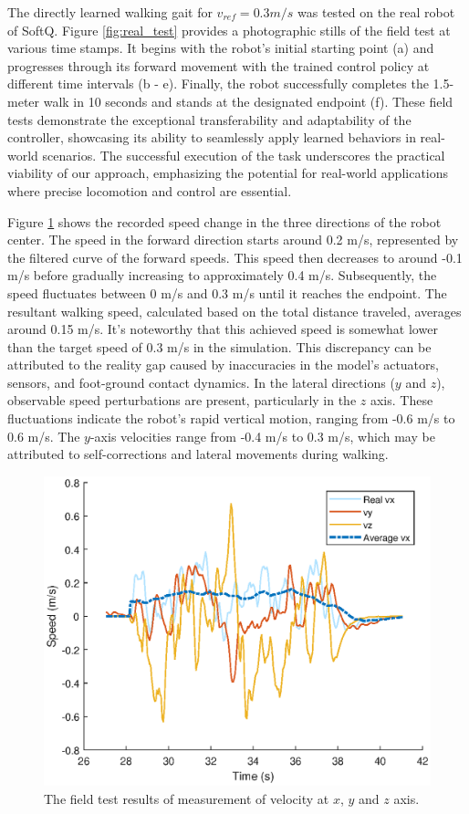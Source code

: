 The directly learned walking gait for $v_{ref} = 0.3m/s$ was tested on the real robot of SoftQ. Figure \ref{fig:real_test} provides a photographic stills of the field test at various time stamps. It begins with the robot's initial starting point (a) and progresses through its forward movement with the trained control policy at different time intervals (b - e). Finally, the robot successfully completes the 1.5-meter walk in 10 seconds and stands at the designated endpoint (f). These field tests demonstrate the exceptional transferability and adaptability of the controller, showcasing its ability to seamlessly apply learned behaviors in real-world scenarios. The successful execution of the task underscores the practical viability of our approach, emphasizing the potential for real-world applications where precise locomotion and control are essential.

Figure \ref{fig:real_v} shows the recorded speed change in the three directions of the robot center. The speed in the forward direction starts around 0.2 m/s, represented by the filtered curve of the forward speeds. This speed then decreases to around -0.1 m/s before gradually increasing to approximately 0.4 m/s. Subsequently, the speed fluctuates between 0 m/s and 0.3 m/s until it reaches the endpoint. The resultant walking speed, calculated based on the total distance traveled, averages around 0.15 m/s. It's noteworthy that this achieved speed is somewhat lower than the target speed of 0.3 m/s in the simulation. This discrepancy can be attributed to the reality gap caused by inaccuracies in the model's actuators, sensors, and foot-ground contact dynamics. In the lateral directions ($y$ and $z$), observable speed perturbations are present, particularly in the $z$ axis. These fluctuations indicate the robot's rapid vertical motion, ranging from -0.6 m/s to 0.6 m/s. The $y$-axis velocities range from -0.4 m/s to 0.3 m/s, which may be attributed to self-corrections and lateral movements during walking. 

\begin{figure}[H]
    \centering
    \includegraphics[width=0.9\linewidth]{img/chap5/real_v.eps}
    \caption{The field test results of measurement of velocity at $x$, $y$ and $z$ axis.}
    \label{fig:real_v}
\end{figure}


